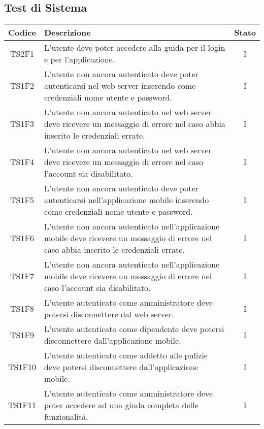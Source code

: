 	\subsection{Test di Sistema}
	\begin{center}
		\begin{longtable}{|c|p{10cm}|c|}
			\hline
			\rowcolor{lighter-grayer}
			\textbf{Codice} & \textbf{Descrizione} & \textbf{Stato}  \\ 
						
			\hline
			\endhead
			
			\hline
			TS2F1 & L'utente deve poter accedere alla guida per il login e per l'applicazione. & I \\
			\hline
			TS1F2 &  L'utente non ancora autenticato deve poter autenticarsi nel web server inserendo come credenziali nome utente e password.  & I \\			
			\hline
			TS1F3 & L'utente non ancora autenticato nel web server deve ricevere un messaggio di errore nel caso abbia inserito le credenziali errate. & I \\			
			\hline
			TS1F4 & L'utente non ancora autenticato nel web server deve ricevere un messaggio di errore nel caso l'account sia disabilitato. & I \\			
			\hline
			TS1F5 & L'utente non ancora autenticato deve poter autenticarsi nell'applicazione mobile inserendo come credenziali nome utente e password. & I \\			
			\hline
			TS1F6 & L'utente non ancora autenticato nell'applicazione mobile deve ricevere un messaggio di errore nel caso abbia inserito le credenziali errate. & I \\			
			\hline
			TS1F7 & L'utente non ancora autenticato nell'applicazione mobile deve ricevere un messaggio di errore nel caso l'account sia disabilitato. & I \\			
			\hline
			TS1F8 & L'utente autenticato come amministratore deve potersi disconnettere dal web server. & I \\			
			\hline
			TS1F9 & L'utente autenticato come dipendente deve potersi disconnettere dall'applicazione mobile. & I \\			
			\hline			
			TS1F10 & L'utente autenticato come addetto alle pulizie deve potersi disconnettere dall'applicazione mobile. & I \\			
			\hline
			TS1F11 & L'utente autenticato come amministratore deve poter accedere ad una giuda completa delle funzionalità. & I \\		

\end{longtable}
\end{center}
